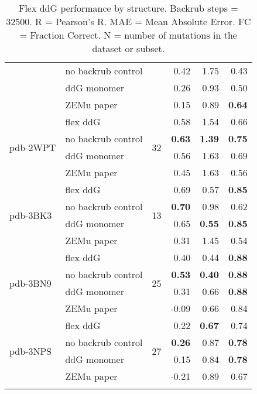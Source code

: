 \begin{longtable}{llrrrr}
 & no backrub control & & 0.42 & 1.75 & 0.43  \\
 & ddG monomer & & 0.26 & 0.93 & 0.50  \\
 & ZEMu paper & & 0.15 & 0.89 & \textbf{0.64}  \\
\hline
 \multirow{ 4}{*}{pdb-2WPT} & flex ddG & \multirow{ 4}{*}{32} & 0.58 & 1.54 & 0.66  \\
 & no backrub control & & \textbf{0.63} & \textbf{1.39} & \textbf{0.75}  \\
 & ddG monomer & & 0.56 & 1.63 & 0.69  \\
 & ZEMu paper & & 0.45 & 1.63 & 0.56  \\
\hline
 \multirow{ 4}{*}{pdb-3BK3} & flex ddG & \multirow{ 4}{*}{13} & 0.69 & 0.57 & \textbf{0.85}  \\
 & no backrub control & & \textbf{0.70} & 0.98 & 0.62  \\
 & ddG monomer & & 0.65 & \textbf{0.55} & \textbf{0.85}  \\
 & ZEMu paper & & 0.31 & 1.45 & 0.54  \\
\hline
 \multirow{ 4}{*}{pdb-3BN9} & flex ddG & \multirow{ 4}{*}{25} & 0.40 & 0.44 & \textbf{0.88}  \\
 & no backrub control & & \textbf{0.53} & \textbf{0.40} & \textbf{0.88}  \\
 & ddG monomer & & 0.31 & 0.66 & \textbf{0.88}  \\
 & ZEMu paper & & -0.09 & 0.66 & 0.84  \\
\hline
 \multirow{ 4}{*}{pdb-3NPS} & flex ddG & \multirow{ 4}{*}{27} & 0.22 & \textbf{0.67} & 0.74  \\
 & no backrub control & & \textbf{0.26} & 0.87 & \textbf{0.78}  \\
 & ddG monomer & & 0.15 & 0.84 & \textbf{0.78}  \\
 & ZEMu paper & & -0.21 & 0.89 & 0.67  \\
 \caption[Flex ddG performance by structure]{
   Flex ddG performance by structure. Backrub steps = 32500. R = Pearson's R. MAE = Mean Absolute Error. FC = Fraction Correct. N = number of mutations in the dataset or subset.
 } \label{tab:table-by-structure}
\end{longtable}
